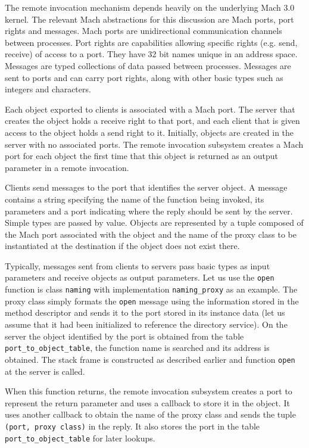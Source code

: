 The remote invocation mechanism depends heavily on the underlying Mach
3.0 kernel\cite{rpd-machnix90}. The relevant Mach abstractions for this discussion are
Mach ports, port rights and messages. Mach ports are unidirectional
communication channels between processes. Port rights are capabilities
allowing specific rights (e.g. send, receive) of access to a port.
They have 32 bit names unique in an address space. Messages are typed
collections of data passed between processes. Messages are sent to
ports and can carry port rights, along with other basic types such as
integers and characters.

Each object exported to clients is associated with a Mach port. The
server that creates the object holds a receive right to that port, and
each client that is given access to the object holds a send right to it.
Initially, objects are created in the server with no associated ports.
The remote invocation subsystem creates a Mach port for each object
the first time that this object is returned as an output parameter in
a remote invocation.

Clients send messages to the port that identifies the server
object. A message contains a string specifying the name of the function being
invoked, its parameters and a port indicating where the reply should be sent
by the server. Simple types are passed by value. Objects are represented
by a tuple composed of the Mach port associated with the object and the
name of the proxy class to be instantiated at the destination if the
object does not exist there.

Typically, messages sent from clients to servers pass basic types as
input parameters and receive objects as output parameters.
Let us use the {\tt open} function is class {\tt naming} with
implementation {\tt naming\_proxy} as an
example. The proxy class simply formats the {\tt open} message using
the information stored in the method descriptor and sends it to
the port stored in its instance data (let us assume that it had been
initialized to reference the directory service). On the server the
object identified by the port is obtained from the table {\tt
port\_to\_object\_table}, the function name is searched and its
address is obtained. The stack frame is constructed as described
earlier and function {\tt open} at the server is called.

When this function returns, the remote invocation subsystem creates a
port to represent the return parameter and uses a callback to store it
in the object. It uses another callback to obtain the name of the
proxy class and sends the tuple {\tt (port, proxy class)} in the reply.
It also stores the port in the table {\tt port\_to\_object\_table} for
later lookups.

